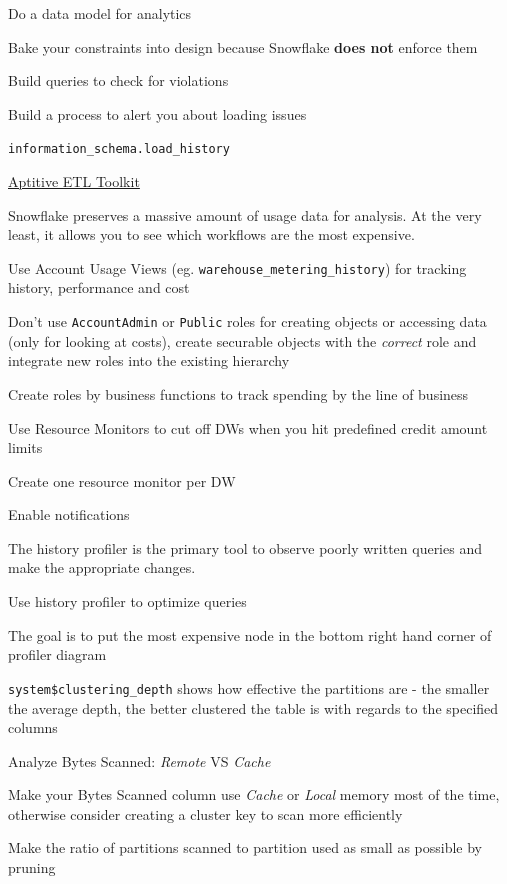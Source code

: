 \documentclass[9pt]{innovativeinnovation-cheatsheet}
\begin{document}
\begin{multicols}{3}
\be{}
      \item Do a data model for analytics
      \item Bake your constraints into design because Snowflake \textbf{does not} enforce them
      \bi{}
            \item Build queries to check for violations
      \ei{}
      \item Build a process to alert you about loading issues
      \bi{}
            \item \texttt{information\_schema.load\_history}
            \item \href{https://aptitive.com/services/data-management/data-integration-strategy/}{Aptitive ETL Toolkit}
      \ei{}
\ee{}


Snowflake preserves a massive amount of usage data for analysis. At the very least, it allows you to see which workflows are the most expensive.

\be{}
      \item Use Account Usage Views (eg. \texttt{warehouse\_metering\_history}) for tracking history, performance and cost
      \item Don't use \texttt{AccountAdmin} or \texttt{Public} roles for creating objects or accessing data (only for looking at costs), create securable objects with the \textit{correct} role and integrate new roles into the existing hierarchy
      \bi{}
            \item Create roles by business functions to track spending by the line of business
      \ei{}
      \item Use Resource Monitors to cut off DWs when you hit predefined credit amount limits
      \bi{}
            \item Create one resource monitor per DW
            \item Enable notifications
      \ei{}
\ee{}


The history profiler is the primary tool to observe poorly written queries and make the appropriate changes.

\be{}
      \item Use history profiler to optimize queries
      \bi{}
            \item The goal is to put the most expensive node in the bottom right hand corner of profiler diagram
            \item \texttt{system\$clustering\_depth} shows how effective the partitions are - the smaller the average depth, the better clustered the table is with regards to the specified columns
      \ei{}
      \item Analyze Bytes Scanned: \textit{Remote} VS \textit{Cache}
      \bi{}
            \item Make your Bytes Scanned column use \textit{Cache} or \textit{Local} memory most of the time, otherwise consider creating a cluster key to scan more efficiently
      \ei{}
      \item Make the ratio of partitions scanned to partition used as small as possible by pruning
\ee{}


\end{multicols}
\end{document}
